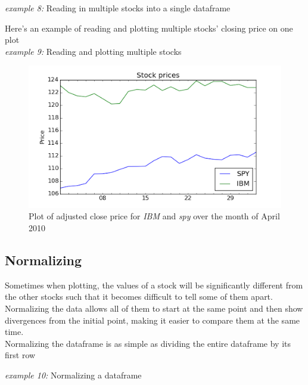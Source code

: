 \noindent
\begin{minipage}{\linewidth}
  \noindent\textit{example 8:} Reading in multiple stocks into a
  single dataframe

  
\end{minipage}

\noindent
\begin{minipage}{\linewidth}
  \noindent Here's an example of reading and plotting multiple
  stocks' closing price on one plot\\
  \noindent\textit{example 9:} Reading and plotting multiple stocks

  
\end{minipage}

\begin{figure}
  \centering
  \includegraphics[width=\textwidth]{images/adj_close_mar.png}
  \caption{Plot of adjusted close price for \textit{IBM} and
  \textit{spy} over the month of April 2010}
\end{figure}

\subsection{Normalizing}
\noindent Sometimes when plotting, the values of a stock will be
significantly different from the other stocks such that it becomes
difficult to tell some of them apart. Normalizing the data allows all
of them to start at the same point and then show divergences from the
initial point, making it easier to compare them at the same time.\\

\noindent Normalizing the dataframe is as simple as dividing the
entire dataframe by its first row
\noindent
\begin{minipage}{\linewidth}
  \noindent\textit{example 10:} Normalizing a dataframe

  
\end{minipage}

